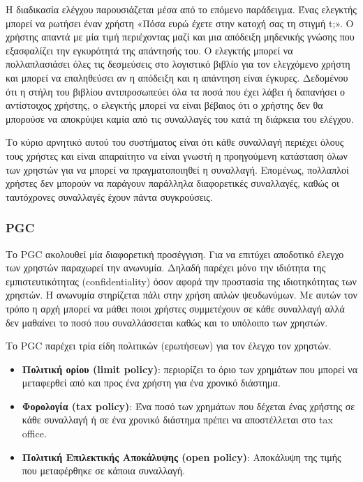 Η διαδικασία ελέγχου παρουσιάζεται μέσα από το επόμενο παράδειγμα. Ένας ελεγκτής μπορεί να ρωτήσει έναν χρήστη «Πόσα ευρώ έχετε στην κατοχή σας τη στιγμή t;». Ο χρήστης απαντά με μία τιμή περιέχοντας μαζί και μια απόδειξη μηδενικής γνώσης που εξασφαλίζει την εγκυρότητά της απάντησής του. Ο ελεγκτής μπορεί να πολλαπλασιάσει όλες τις δεσμεύσεις στο λογιστικό βιβλίο για τον ελεγχόμενο χρήστη και μπορεί να επαληθεύσει αν η απόδειξη και η απάντηση είναι έγκυρες. Δεδομένου ότι η στήλη του βιβλίου αντιπροσωπεύει όλα τα ποσά που έχει λάβει ή δαπανήσει ο αντίστοιχος χρήστης, ο ελεγκτής μπορεί να είναι βέβαιος ότι ο χρήστης δεν θα μπορούσε να αποκρύψει καμία από τις συναλλαγές του κατά τη διάρκεια του ελέγχου.

Το κύριο αρνητικό αυτού του συστήματος είναι ότι κάθε συναλλαγή περιέχει όλους τους χρήστες και είναι απαραίτητο να είναι γνωστή η προηγούμενη κατάσταση όλων των χρηστών για να μπορεί να πραγματοποιηθεί η συναλλαγή. Επομένως, πολλαπλοί χρήστες δεν μπορούν να παράγουν παράλληλα διαφορετικές συναλλαγές, καθώς οι ταυτόχρονες συναλλαγές έχουν πάντα συγκρούσεις.

\subsubsection{PGC}
Το PGC ακολουθεί μία διαφορετική προσέγγιση. Για να επιτύχει αποδοτικό έλεγχο των χρηστών παραχωρεί την ανωνυμία. Δηλαδή παρέχει μόνο την ιδιότητα της εμπιστευτικότητας (confidentiality) όσον αφορά την προστασία της ιδιοτηκότητας των χρηστών. Η ανωνυμία στηρίζεται πάλι στην χρήση απλών ψευδωνύμων. Με αυτών τον τρόπο η αρχή μπορεί να μάθει ποιοι χρήστες συμμετέχουν σε κάθε συναλλαγή αλλά δεν μαθαίνει το ποσό που συναλλάσσεται καθώς και το υπόλοιπο των χρηστών. 

Το PGC παρέχει τρία είδη πολιτικών (ερωτήσεων) για τον έλεγχο τον χρηστών. 
\begin{itemize}
    \item \textbf{Πολιτική ορίου (limit policy)}: περιορίζει το όριο των χρημάτων που μπορεί να μεταφερθεί από και προς ένα χρήστη για ένα χρονικό διάστημα.
    \item \textbf{Φορολογία (tax policy)}: Ένα ποσό των χρημάτων που δέχεται ένας χρήστης σε κάθε συναλλαγή ή σε ένα χρονικό διάστημα πρέπει να αποστέλλεται στο tax office.
    \item \textbf{Πολιτική Επιλεκτικής Αποκάλυψης (open policy)}: Αποκάλυψη της τιμής που μεταφέρθηκε σε κάποια συναλλαγή.
\end{itemize}

